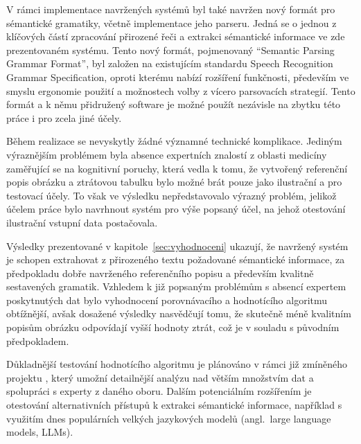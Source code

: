 V rámci implementace navržených systémů byl také navržen nový formát pro sémantické gramatiky, včetně implementace jeho parseru.
Jedná se o jednou z klíčových částí zpracování přirozené řeči a extrakci sémantické informace ve zde prezentovaném systému.
Tento nový formát, pojmenovaný \enquote{Semantic Parsing Grammar Format}, byl založen na existujícím standardu Speech Recognition Grammar Specification,
oproti kterému nabízí rozšíření funkčnosti, především ve smyslu ergonomie použití a možnostech volby z vícero parsovacích strategií.
Tento formát a k němu přidružený software je možné použít nezávisle na zbytku této práce i pro zcela jiné účely.

Během realizace se nevyskytly žádné významné technické komplikace.
Jediným výraznějším problémem byla absence expertních znalostí z oblasti medicíny zaměřující se na kognitivní poruchy,
která vedla k tomu, že vytvořený referenční popis obrázku a ztrátovou tabulku bylo možné brát pouze jako ilustrační a pro testovací účely.
To však ve výsledku nepředstavovalo výrazný problém, jelikož účelem práce bylo navrhnout systém pro výše popsaný účel,
na jehož otestování ilustrační vstupní data postačovala.


Výsledky prezentované v kapitole~\ref{sec:vyhodnoceni} ukazují, že navržený systém je schopen extrahovat z přirozeného
textu požadované sémantické informace, za předpokladu dobře navrženého referenčního popisu a především kvalitně sestavených gramatik.
Vzhledem k již popsaným problémům s absencí expertem poskytnutých dat bylo vyhodnocení porovnávacího a hodnotícího algoritmu
obtížnější, avšak dosažené výsledky nasvědčují tomu, že skutečně méně kvalitním popisům obrázku odpovídají vyšší hodnoty
ztrát, což je v souladu s původním předpokladem.

Důkladnější testování hodnotícího algoritmu je plánováno v rámci již zmíněného projektu \projekt{},
který umožní detailnější analýzu nad větším množstvím dat a spolupráci s experty z daného oboru.
Dalším potenciálním rozšířením je otestování alternativních přístupů k extrakci sémantické informace,
například s využitím dnes populárních velkých jazykových modelů (angl.~large language models, LLMs).


